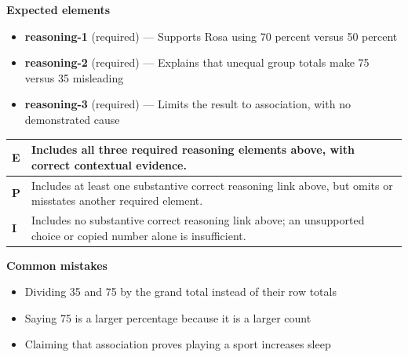 \documentclass[11pt]{article}
\begin{document}

\textbf{Expected elements}
\begin{itemize}[leftmargin=1.5em,itemsep=2pt,topsep=2pt]
  \item \textbf{reasoning-1} (required) --- Supports Rosa using 70 percent versus 50 percent
  \item \textbf{reasoning-2} (required) --- Explains that unequal group totals make 75 versus 35 misleading
  \item \textbf{reasoning-3} (required) --- Limits the result to association, with no demonstrated cause
\end{itemize}

{\small\renewcommand{\arraystretch}{1.25}
\noindent\begin{tabular}{|p{0.5in}|p{5.9in}|}
\hline
\textbf{E} & Includes all three required reasoning elements above, with correct contextual evidence. \\ \hline
\textbf{P} & Includes at least one substantive correct reasoning link above, but omits or misstates another required element. \\ \hline
\textbf{I} & Includes no substantive correct reasoning link above; an unsupported choice or copied number alone is insufficient. \\ \hline
\end{tabular}}

\textbf{Common mistakes}
\begin{itemize}[leftmargin=1.5em,itemsep=2pt,topsep=2pt]
  \item Dividing 35 and 75 by the grand total instead of their row totals
  \item Saying 75 is a larger percentage because it is a larger count
  \item Claiming that association proves playing a sport increases sleep
\end{itemize}

\clearpage
{}
\end{document}
